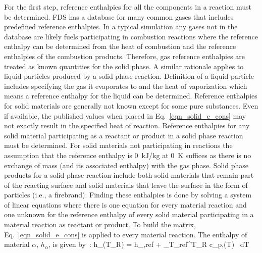 For the first step, reference enthalpies for all the components in a reaction must be determined. FDS has a database for many common gases that includes predefined reference enthalpies. In a typical simulation any gases not in the database are likely fuels participating in combustion reactions where the reference enthalpy can be determined from the heat of combustion and the reference enthalpies of the combustion products. Therefore, gas reference enthalpies are treated as known quantities for the solid phase. A similar rationale applies to liquid particles produced by a solid phase reaction. Definition of a liquid particle includes specifying the gas it evaporates to and the heat of vaporization which means a reference enthalpy for the liquid can be determined. Reference enthalpies for solid materials are generally not known except for some pure substances. Even if available, the published values when placed in Eq.~\ref{eqn_solid_e_cons} may not exactly result in the specified heat of reaction. Reference enthalpies for any solid material participating as a reactant or product in a solid phase reaction must be determined. For solid materials not participating in reactions the assumption that the reference enthalpy is 0~kJ/kg at 0~K suffices as there is no exchange of mass (and its associated enthalpy) with the gas phase. Solid phase products for a solid phase reaction include both solid materials that remain part of the reacting surface and solid materials that leave the surface in the form of particles (i.e., a firebrand). Finding these enthalpies is done by solving a system of linear equations where there is one equation for every material reaction and one unknown for the reference enthalpy of every solid material participating in a material reaction as reactant or product. To build the matrix, Eq.~\ref{eqn_solid_e_cons} is applied to every material reaction. The enthalpy of material $\alpha$, $h_{\alpha}$, is given by~\cite{NIST_JANAF}:
\be
  h_{\alpha}(T_{\rm R}) = h_{\alpha,{\rm ref}} + \int_{T_{\rm ref}}^{T_{\rm R}} c_{p,\alpha}(T) \, \mbox{d}T
\ee

